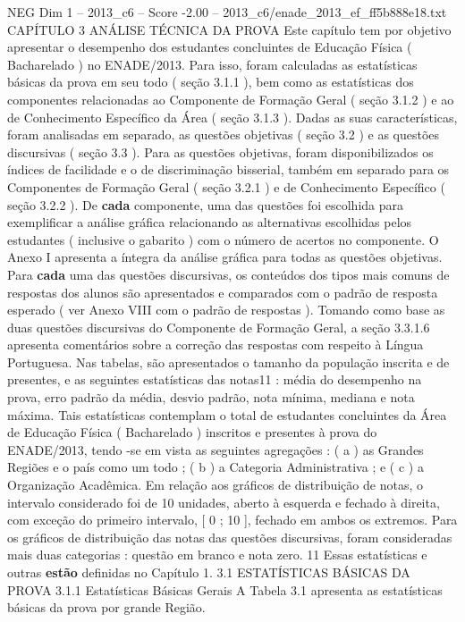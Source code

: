 \begin{textsample}{NEG Dim 1 – 2013\_c6 – Score -2.00 – 2013\_c6/enade\_2013\_ef\_ff5b888e18.txt}  \label{ex:f1_neg_268}
CAPÍTULO 3 ANÁLISE TÉCNICA DA PROVA Este capítulo tem por objetivo apresentar o desempenho dos estudantes concluintes de Educação Física ( Bacharelado ) no ENADE/2013.
Para isso, foram calculadas as estatísticas básicas da prova em seu todo ( seção 3.1.1 ), bem como as estatísticas dos componentes relacionadas ao Componente de Formação Geral ( seção 3.1.2 ) e ao de Conhecimento Específico da Área ( seção 3.1.3 ).
Dadas as suas características, foram analisadas em separado, as questões objetivas ( seção 3.2 ) e as questões discursivas ( seção 3.3 ).
Para as questões objetivas, foram disponibilizados os índices de facilidade e o de discriminação bisserial, também em separado para os Componentes de Formação Geral ( seção 3.2.1 ) e de Conhecimento Específico ( seção 3.2.2 ).
De \textbf{cada} componente, uma das questões foi escolhida para exemplificar a análise gráfica relacionando as alternativas escolhidas pelos estudantes ( inclusive o gabarito ) com o número de acertos no componente.
O Anexo I apresenta a íntegra da análise gráfica para todas as questões objetivas.
Para \textbf{cada} uma das questões discursivas, os conteúdos dos tipos mais comuns de respostas dos alunos são apresentados e comparados com o padrão de resposta esperado ( ver Anexo VIII com o padrão de respostas ).
Tomando como base as duas questões discursivas do Componente de Formação Geral, a seção 3.3.1.6 apresenta comentários sobre a correção das respostas com respeito à Língua Portuguesa.
Nas tabelas, são apresentados o tamanho da população inscrita e de presentes, e as seguintes estatísticas das notas11 : média do desempenho na prova, erro padrão da média, desvio padrão, nota mínima, mediana e nota máxima.
Tais estatísticas contemplam o total de estudantes concluintes da Área de Educação Física ( Bacharelado ) inscritos e presentes à prova do ENADE/2013, tendo -se em vista as seguintes agregações : ( a ) as Grandes Regiões e o país como um todo ; ( b ) a Categoria Administrativa ; e ( c ) a Organização Acadêmica.
Em relação aos gráficos de distribuição de notas, o intervalo considerado foi de 10 unidades, aberto à esquerda e fechado à direita, com exceção do primeiro intervalo, [ 0 ; 10 ], fechado em ambos os extremos.
Para os gráficos de distribuição das notas das questões discursivas, foram consideradas mais duas categorias : questão em branco e nota zero. 11 Essas estatísticas e outras \textbf{estão} definidas no Capítulo 1. 3.1 ESTATÍSTICAS BÁSICAS DA PROVA 3.1.1 Estatísticas Básicas Gerais A Tabela 3.1 apresenta as estatísticas básicas da prova por grande Região.

\end{textsample}
